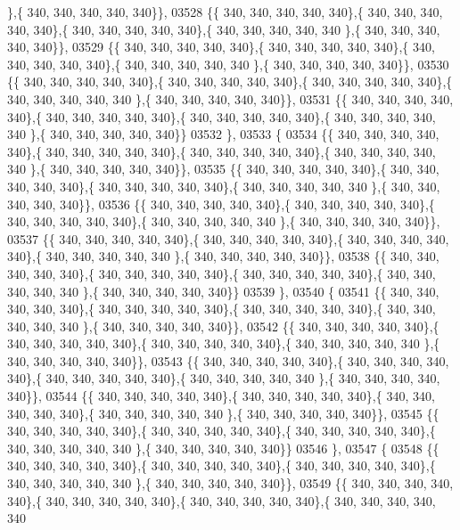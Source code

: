 \begin{DoxyCode}
      \},\{ 340, 340, 340, 340, 340\}\},
03528 \{\{ 340, 340, 340, 340, 340\},\{ 340, 340, 340, 340, 340\},\{ 340, 340, 340, 340, 340\},\{ 340, 340, 340, 340, 340
      \},\{ 340, 340, 340, 340, 340\}\},
03529 \{\{ 340, 340, 340, 340, 340\},\{ 340, 340, 340, 340, 340\},\{ 340, 340, 340, 340, 340\},\{ 340, 340, 340, 340, 340
      \},\{ 340, 340, 340, 340, 340\}\},
03530 \{\{ 340, 340, 340, 340, 340\},\{ 340, 340, 340, 340, 340\},\{ 340, 340, 340, 340, 340\},\{ 340, 340, 340, 340, 340
      \},\{ 340, 340, 340, 340, 340\}\},
03531 \{\{ 340, 340, 340, 340, 340\},\{ 340, 340, 340, 340, 340\},\{ 340, 340, 340, 340, 340\},\{ 340, 340, 340, 340, 340
      \},\{ 340, 340, 340, 340, 340\}\}
03532 \},
03533 \{
03534 \{\{ 340, 340, 340, 340, 340\},\{ 340, 340, 340, 340, 340\},\{ 340, 340, 340, 340, 340\},\{ 340, 340, 340, 340, 340
      \},\{ 340, 340, 340, 340, 340\}\},
03535 \{\{ 340, 340, 340, 340, 340\},\{ 340, 340, 340, 340, 340\},\{ 340, 340, 340, 340, 340\},\{ 340, 340, 340, 340, 340
      \},\{ 340, 340, 340, 340, 340\}\},
03536 \{\{ 340, 340, 340, 340, 340\},\{ 340, 340, 340, 340, 340\},\{ 340, 340, 340, 340, 340\},\{ 340, 340, 340, 340, 340
      \},\{ 340, 340, 340, 340, 340\}\},
03537 \{\{ 340, 340, 340, 340, 340\},\{ 340, 340, 340, 340, 340\},\{ 340, 340, 340, 340, 340\},\{ 340, 340, 340, 340, 340
      \},\{ 340, 340, 340, 340, 340\}\},
03538 \{\{ 340, 340, 340, 340, 340\},\{ 340, 340, 340, 340, 340\},\{ 340, 340, 340, 340, 340\},\{ 340, 340, 340, 340, 340
      \},\{ 340, 340, 340, 340, 340\}\}
03539 \},
03540 \{
03541 \{\{ 340, 340, 340, 340, 340\},\{ 340, 340, 340, 340, 340\},\{ 340, 340, 340, 340, 340\},\{ 340, 340, 340, 340, 340
      \},\{ 340, 340, 340, 340, 340\}\},
03542 \{\{ 340, 340, 340, 340, 340\},\{ 340, 340, 340, 340, 340\},\{ 340, 340, 340, 340, 340\},\{ 340, 340, 340, 340, 340
      \},\{ 340, 340, 340, 340, 340\}\},
03543 \{\{ 340, 340, 340, 340, 340\},\{ 340, 340, 340, 340, 340\},\{ 340, 340, 340, 340, 340\},\{ 340, 340, 340, 340, 340
      \},\{ 340, 340, 340, 340, 340\}\},
03544 \{\{ 340, 340, 340, 340, 340\},\{ 340, 340, 340, 340, 340\},\{ 340, 340, 340, 340, 340\},\{ 340, 340, 340, 340, 340
      \},\{ 340, 340, 340, 340, 340\}\},
03545 \{\{ 340, 340, 340, 340, 340\},\{ 340, 340, 340, 340, 340\},\{ 340, 340, 340, 340, 340\},\{ 340, 340, 340, 340, 340
      \},\{ 340, 340, 340, 340, 340\}\}
03546 \},
03547 \{
03548 \{\{ 340, 340, 340, 340, 340\},\{ 340, 340, 340, 340, 340\},\{ 340, 340, 340, 340, 340\},\{ 340, 340, 340, 340, 340
      \},\{ 340, 340, 340, 340, 340\}\},
03549 \{\{ 340, 340, 340, 340, 340\},\{ 340, 340, 340, 340, 340\},\{ 340, 340, 340, 340, 340\},\{ 340, 340, 340, 340, 340

\end{DoxyCode}
